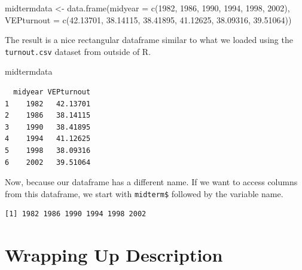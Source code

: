 \documentclass[
  letterpaper,
  DIV=11,
  numbers=noendperiod]{scrreprt}
\newenvironment{Shaded}{\begin{snugshade}}{\end{snugshade}}
\newcommand{\AttributeTok}[1]{\textcolor[rgb]{0.40,0.45,0.13}{#1}}
\newcommand{\DecValTok}[1]{\textcolor[rgb]{0.68,0.00,0.00}{#1}}
\newcommand{\FloatTok}[1]{\textcolor[rgb]{0.68,0.00,0.00}{#1}}
\newcommand{\FunctionTok}[1]{\textcolor[rgb]{0.28,0.35,0.67}{#1}}
\newcommand{\NormalTok}[1]{\textcolor[rgb]{0.00,0.23,0.31}{#1}}
\newcommand{\OtherTok}[1]{\textcolor[rgb]{0.00,0.23,0.31}{#1}}
\newcommand{\SpecialCharTok}[1]{\textcolor[rgb]{0.37,0.37,0.37}{#1}}
\begin{document}
\begin{Shaded}
\begin{Highlighting}[]
\NormalTok{midtermdata }\OtherTok{\textless{}{-}} \FunctionTok{data.frame}\NormalTok{(}\AttributeTok{midyear =} \FunctionTok{c}\NormalTok{(}\DecValTok{1982}\NormalTok{, }\DecValTok{1986}\NormalTok{, }\DecValTok{1990}\NormalTok{, }\DecValTok{1994}\NormalTok{, }\DecValTok{1998}\NormalTok{, }\DecValTok{2002}\NormalTok{), }
                          \AttributeTok{VEPturnout =} \FunctionTok{c}\NormalTok{(}\FloatTok{42.13701}\NormalTok{, }\FloatTok{38.14115}\NormalTok{, }\FloatTok{38.41895}\NormalTok{, }\FloatTok{41.12625}\NormalTok{, }\FloatTok{38.09316}\NormalTok{, }\FloatTok{39.51064}\NormalTok{))}
\end{Highlighting}
\end{Shaded}

The result is a nice rectangular dataframe similar to what we loaded
using the \texttt{turnout.csv} dataset from outside of R.

\begin{Shaded}
\begin{Highlighting}[]
\NormalTok{midtermdata}
\end{Highlighting}
\end{Shaded}

\begin{verbatim}
  midyear VEPturnout
1    1982   42.13701
2    1986   38.14115
3    1990   38.41895
4    1994   41.12625
5    1998   38.09316
6    2002   39.51064
\end{verbatim}

Now, because our dataframe has a different name. If we want to access
columns from this dataframe, we start with \texttt{midterm\$} followed
by the variable name.

\begin{Shaded}
\end{Shaded}

\begin{verbatim}
[1] 1982 1986 1990 1994 1998 2002
\end{verbatim}

\hypertarget{wrapping-up-description}{%
\section{Wrapping Up Description}\label{wrapping-up-description}}
\end{document}
